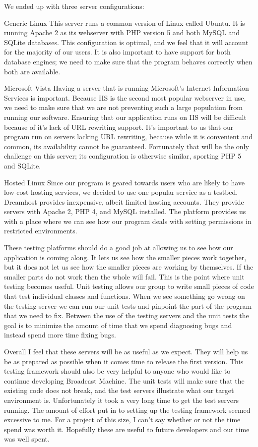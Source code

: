\documentclass[a4paper,12pt]{report}
\begin{document}
We ended up with three server configurations:
\begin{description}
	\item{Generic Linux} This server runs a common version of Linux called Ubuntu. It is running Apache 2 as its webserver with PHP version 5 and both MySQL and SQLite databases. This configuration is optimal, and we feel that it will account for the majority of our users. It is also important to have support for both database engines; we need to make sure that the program behaves correctly when both are available.
	\item{Microsoft Vista} Having a server that is running Microsoft's Internet Information Services is important. 
Because IIS is the second most popular webserver in use, we need to make sure that we are not preventing such a large population from running our software. Ensuring that our application runs on IIS will be difficult because of it's lack of URL rewriting support. It's important to us that our program run on servers lacking URL rewriting, because while it is convenient and common, its availability cannot be guaranteed. Fortunately that will be the only challenge on this server; its configuration is otherwise similar, sporting PHP 5 and SQLite.
	\item{Hosted Linux} Since our program is geared towards users who are likely to have low-cost hosting services, we decided to use one popular service as a testbed. Dreamhost provides inexpensive, albeit limited hosting accounts. They provide servers with Apache 2, PHP 4, and MySQL installed. The platform provides us with a place where we can see how our program deals with setting permissions in restricted environments.
\end{description}

These testing platforms should do a good job at allowing us to see how our application is coming along.
It lets us see how the smaller pieces work together, but it does not let us see how the smaller pieces are working by themselves.
If the smaller parts do not work then the whole will fail.
This is the point where unit testing becomes useful.
Unit testing allows our group to write small pieces of code that test individual classes and functions.
When we see something go wrong on the testing server we can run our unit tests and pinpoint the part of the program that we need to fix.
Between the use of the testing servers and the unit tests the goal is to minimize the amount of time that we spend diagnosing bugs and instead spend more time fixing bugs.

Overall I feel that these servers will be as useful as we expect.
They will help us be as prepared as possible when it comes time to release the first version.
This testing framework should also be very helpful to anyone who would like to continue developing Broadcast Machine.
The unit tests will make sure that the existing code does not break, and the test servers illustrate what our target environment is.
Unfortunately it took a very long time to get the test servers running.
The amount of effort put in to setting up the testing framework seemed excessive to me.
For a project of this size, I can't say whether or not the time spend was worth it.
Hopefully these are useful to future developers and our time was well spent. 
\end{document}
